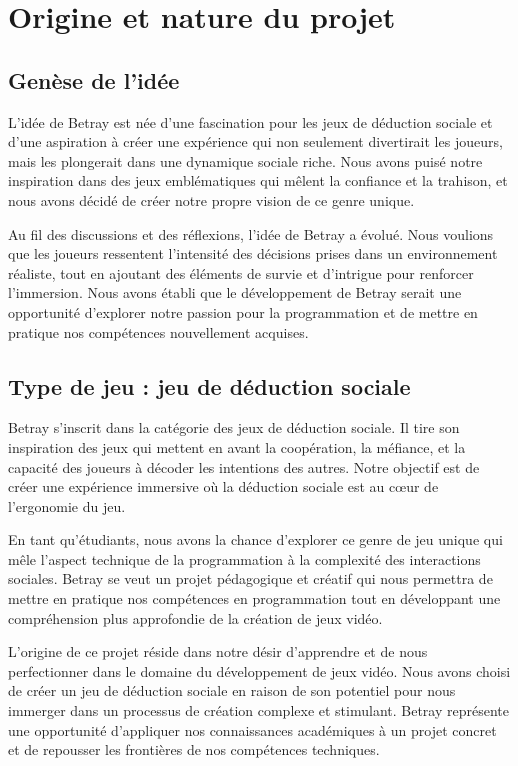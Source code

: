\documentclass[
	article,			%
	11pt,				%
	oneside,			%
	a4paper,			%
	chapter=TITLE,
	french,			%
	sumario=tradicional
	]{base_nt}
\begin{document}
\section{Origine et nature du projet}

\subsection{Genèse de l'idée}

L'idée de Betray est née d'une fascination pour les jeux de déduction sociale et d'une aspiration à créer une expérience qui non seulement divertirait les joueurs, mais les plongerait dans une dynamique sociale riche. Nous avons puisé notre inspiration dans des jeux emblématiques qui mêlent la confiance et la trahison, et nous avons décidé de créer notre propre vision de ce genre unique.

Au fil des discussions et des réflexions, l'idée de Betray a évolué. Nous voulions que les joueurs ressentent l'intensité des décisions prises dans un environnement réaliste, tout en ajoutant des éléments de survie et d'intrigue pour renforcer l'immersion. Nous avons établi que le développement de Betray serait une opportunité d'explorer notre passion pour la programmation et de mettre en pratique nos compétences nouvellement acquises.

\subsection{Type de jeu : jeu de déduction sociale}

Betray s'inscrit dans la catégorie des jeux de déduction sociale. Il tire son inspiration des jeux qui mettent en avant la coopération, la méfiance, et la capacité des joueurs à décoder les intentions des autres. Notre objectif est de créer une expérience immersive où la déduction sociale est au cœur de l'ergonomie du jeu.

En tant qu'étudiants, nous avons la chance d'explorer ce genre de jeu unique qui mêle l'aspect technique de la programmation à la complexité des interactions sociales. Betray se veut un projet pédagogique et créatif qui nous permettra de mettre en pratique nos compétences en programmation tout en développant une compréhension plus approfondie de la création de jeux vidéo.

L'origine de ce projet réside dans notre désir d'apprendre et de nous perfectionner dans le domaine du développement de jeux vidéo. Nous avons choisi de créer un jeu de déduction sociale en raison de son potentiel pour nous immerger dans un processus de création complexe et stimulant. Betray représente une opportunité d'appliquer nos connaissances académiques à un projet concret et de repousser les frontières de nos compétences techniques.
\end{document}
